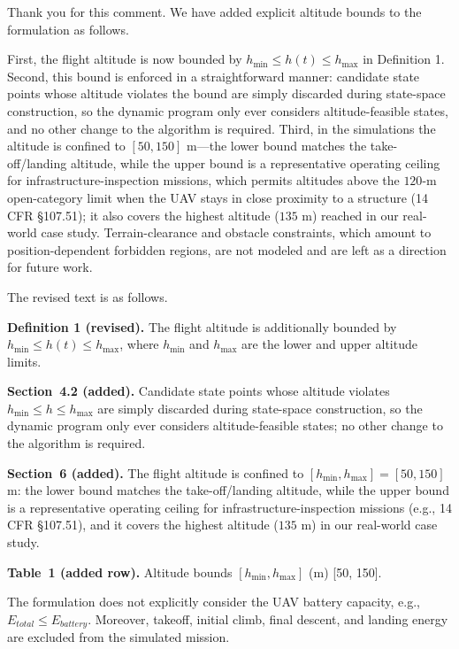 \begin{revresponse}[]
	Thank you for this comment. We have added explicit altitude bounds to the formulation as follows.

	First, the flight altitude is now bounded by $h_{\min} \le h(t) \le h_{\max}$ in Definition 1. Second, this bound is enforced in a straightforward manner: candidate state points whose altitude violates the bound are simply discarded during state-space construction, so the dynamic program only ever considers altitude-feasible states, and no other change to the algorithm is required. Third, in the simulations the altitude is confined to $[50,150]$ m---the lower bound matches the take-off/landing altitude, while the upper bound is a representative operating ceiling for infrastructure-inspection missions, which permits altitudes above the $120$-m open-category limit when the UAV stays in close proximity to a structure (14 CFR \S 107.51); it also covers the highest altitude ($135$ m) reached in our real-world case study. Terrain-clearance and obstacle constraints, which amount to position-dependent forbidden regions, are not modeled and are left as a direction for future work.

	The revised text is as follows.
	\begin{changes}
		\textbf{Definition 1 (revised).} The flight altitude is additionally bounded by $h_{\min} \le h(t) \le h_{\max}$, where $h_{\min}$ and $h_{\max}$ are the lower and upper altitude limits.

		\textbf{Section~4.2 (added).} Candidate state points whose altitude violates $h_{\min} \le h \le h_{\max}$ are simply discarded during state-space construction, so the dynamic program only ever considers altitude-feasible states; no other change to the algorithm is required.

		\textbf{Section~6 (added).} The flight altitude is confined to $[h_{\min}, h_{\max}]=[50,150]$ m: the lower bound matches the take-off/landing altitude, while the upper bound is a representative operating ceiling for infrastructure-inspection missions (e.g., 14 CFR \S 107.51), and it covers the highest altitude ($135$ m) in our real-world case study.

		\textbf{Table~1 (added row).} Altitude bounds $[h_{\min},h_{\max}]$ (m) [50, 150].
	\end{changes}
\end{revresponse}

\begin{revcomment}
	The formulation does not explicitly consider the UAV battery capacity, e.g., $E_{total}\le E_{battery}$. Moreover, takeoff, initial climb, final descent, and landing energy are excluded from the simulated mission.
\end{revcomment}

